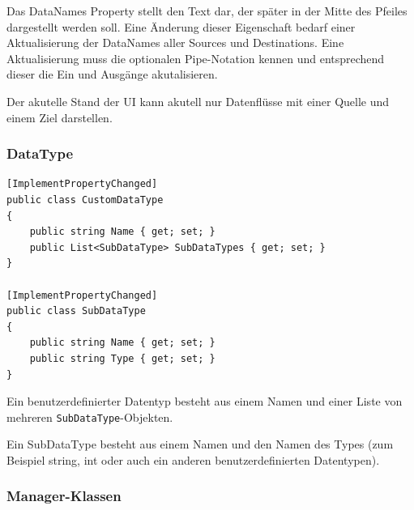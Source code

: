 Das DataNames Property stellt den Text dar, der später in der Mitte des
Pfeiles dargestellt werden soll. Eine Änderung dieser Eigenschaft bedarf
einer Aktualisierung der DataNames aller Sources und Destinations.
Eine Aktualisierung muss die optionalen Pipe-Notation kennen und
entsprechend dieser die Ein und Ausgänge akutalisieren.

Der akutelle Stand der UI kann akutell nur Datenflüsse mit einer Quelle und
einem Ziel darstellen.

\subsubsection{DataType}


\begin{lstlisting}[caption= CustomDataType und SubDataType Klasse]
[ImplementPropertyChanged]
public class CustomDataType
{
	public string Name { get; set; }
	public List<SubDataType> SubDataTypes { get; set; }
}

[ImplementPropertyChanged]
public class SubDataType
{
	public string Name { get; set; }
	public string Type { get; set; }
}
\end{lstlisting}

Ein benutzerdefinierter Datentyp besteht aus einem Namen und einer Liste von mehreren
\texttt{SubDataType}-Objekten. 

Ein SubDataType besteht aus einem Namen und den Namen
des Types (zum Beispiel string, int oder auch ein anderen benutzerdefinierten
Datentypen).

\subsubsection{Manager-Klassen}

